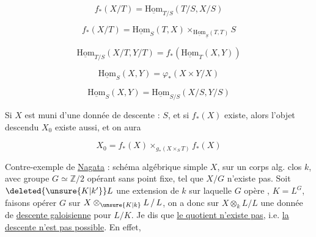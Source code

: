 

\[
f_*(X/T)=\underline{\mathrm{Hom}}_{T/S}(T/S,X/S)
\]

\[
f_*(X/T)=\underline{\mathrm{Hom}}_{S}(T,X)\times_{\underline{\mathrm{Hom}}_{\underline S}(T,T)}S
\]

\[
\underline{\mathrm{Hom}}_{T/S}(X/T,Y/T)=f_*(\underline{\mathrm{Hom}}_T(X,Y))
\]

\[
\underline{\mathrm{Hom}}_S(X,Y)=\varphi_*(X\times Y/X)
\]

\[
\underline{\mathrm{Hom}}_S(X,Y)=\underline{\mathrm{Hom}}_{S/S}(X/S,Y/S)
\]

Si $X$ est muni d'une donnée de descente : $S$, et si $f_*(X)$ existe, alors l'objet descendu $X_0$ existe aussi, et on aura

\[
X_0=f_*(X)\times_{g_*(X\times_S T)}f_*(X)
\]

Contre-exemple de \uline{Nagata} : schéma algébrique simple  $X$, sur un corps alg. clos $k$, avec groupe $G\simeq\mathbb{Z}/2$ opérant sans point fixe, tel que $X/G$ n'existe pas. Soit $\deleted{\unsure{K|k'}}L$ une extension de $k$ sur laquelle $G$ opère  ,  $K=L^G$, faisons opérer $G$ \uline{} sur $X\otimes_{\unsure{K|k}}L\,/\,L$, on a donc sur $X\otimes_k L/L$ une donnée de \uline{descente galoisienne} pour $L/K$. Je dis que \uline{le quotient n'existe pas}, i.e. \uline{la descente n'est pas possible}. En effet, 

\deleted{\[
(X\otimes_kL)\otimes_K\unsure{L|\overline L}=X\otimes_k(L\otimes_KL)=X\otimes_kL
\]}

